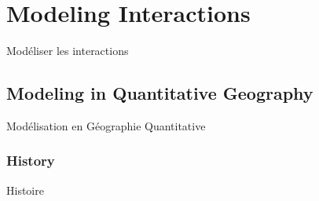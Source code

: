 




\newpage

\section{Modeling Interactions}{Modéliser les interactions}
\label{sec:modelingsa}






\subsection{Modeling in Quantitative Geography}{Modélisation en Géographie Quantitative}


\subsubsection{History}{Histoire}

